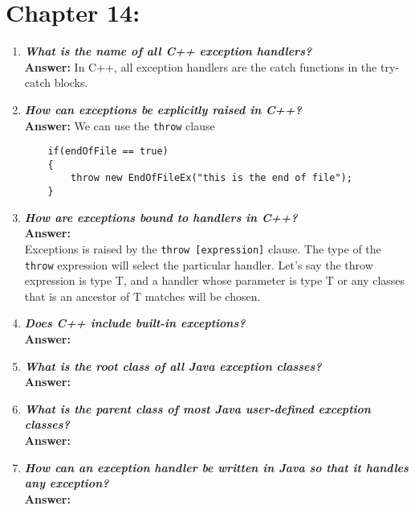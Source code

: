 \documentclass{article}
\begin{document}
\section{Chapter 14:}
\begin{enumerate}

\item 
\textbf{\textit{What is the name of all C++ exception handlers?}}\\
\textbf{Answer: } In C++, all exception handlers are the catch functions in the try-catch blocks.

\item 
\textbf{\textit{How can exceptions be explicitly raised in C++?}}\\
\textbf{Answer: } We can use the \lstinline{throw} clause\\
\begin{lstlisting}
	if(endOfFile == true)
	{
		throw new EndOfFileEx("this is the end of file");
	}
\end{lstlisting}


\item 
\textbf{\textit{How are exceptions bound to handlers in C++?}}\\
\textbf{Answer: }\\ 
Exceptions is raised by the \lstinline{throw [expression]} clause. The type of the \lstinline{throw} expression will select the particular handler. Let's say the throw expression is type T, and a handler whose parameter is type T or any classes that is an ancestor of T matches will be chosen.\\


\item 
\textbf{\textit{Does C++ include built-in exceptions?}}\\
\textbf{Answer: }

\item 
\textbf{\textit{What is the root  class of all Java exception classes?}}\\
\textbf{Answer: }

\item 
\textbf{\textit{What is the parent class of most Java user-defined exception classes?}}\\
\textbf{Answer: }

\item 
\textbf{\textit{How can an exception handler be written in Java so that it handles any exception?}}\\
\textbf{Answer: }


\end{enumerate}
\end{document}

